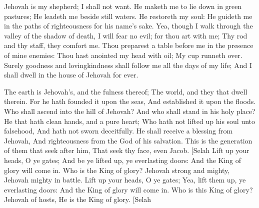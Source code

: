 Jehovah is my shepherd; I shall not want.  He maketh me to lie down in green pastures; He leadeth me beside still waters.  He restoreth my soul: He guideth me in the paths of righteousness for his name’s sake.  Yea, though I walk through the valley of the shadow of death, I will fear no evil; for thou art with me; Thy rod and thy staff, they comfort me.  Thou preparest a table before me in the presence of mine enemies: Thou hast anointed my head with oil; My cup runneth over.  Surely goodness and lovingkindness shall follow me all the days of my life; And I shall dwell in the house of Jehovah for ever. 

The earth is Jehovah’s, and the fulness thereof; The world, and they that dwell therein.  For he hath founded it upon the seas, And established it upon the floods.  Who shall ascend into the hill of Jehovah? And who shall stand in his holy place?  He that hath clean hands, and a pure heart; Who hath not lifted up his soul unto falsehood, And hath not sworn deceitfully.  He shall receive a blessing from Jehovah, And righteousness from the God of his salvation.  This is the generation of them that seek after him, That seek thy face, even Jacob. [Selah  Lift up your heads, O ye gates; And be ye lifted up, ye everlasting doors: And the King of glory will come in.  Who is the King of glory? Jehovah strong and mighty, Jehovah mighty in battle.  Lift up your heads, O ye gates; Yea, lift them up, ye everlasting doors: And the King of glory will come in.  Who is this King of glory? Jehovah of hosts, He is the King of glory. [Selah 

